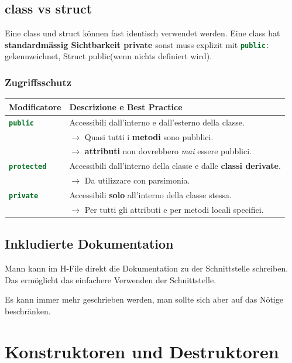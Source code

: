 \subsection{class vs struct}

Eine class und struct können fast identisch verwendet werden. 
Eine class hat \textbf{standardmässig Sichtbarkeit private} sonst muss explizit mit \lstinline[language=C++]|public:| gekennzeichnet, Struct public(wenn nichts definiert wird).

\subsubsection{Zugriffsschutz}
\begin{tabular}{|l|l|}
    \hline
    \textbf{Modificatore} & \textbf{Descrizione e Best Practice} \\ \hline
    \lstinline[language=C++]|public| & Accessibili dall'interno e dall'esterno della classe. \\ 
    & $\rightarrow$ Quasi tutti i \textbf{metodi} sono pubblici. \\ 
    & $\rightarrow$ \textbf{attributi} non dovrebbero \textit{mai} essere pubblici. \\ \hline
    \lstinline[language=C++]|protected| & Accessibili dall'interno della classe e dalle \textbf{classi derivate}. \\ 
    & $\rightarrow$ Da utilizzare con parsimonia. \\ \hline
    \lstinline[language=C++]|private| & Accessibili \textbf{solo} all'interno della classe stessa. \\ 
    & $\rightarrow$ Per tutti gli attributi e per metodi locali specifici. \\ \hline
\end{tabular}

\subsection{Inkludierte Dokumentation}

Mann kann im H-File direkt die Dokumentation zu der Schnittstelle schreiben. 
Das ermöglicht das einfachere Verwenden der Schnittstelle.



Es kann immer mehr geschrieben werden, man sollte sich aber auf das Nötige beschränken.

\section{Konstruktoren und Destruktoren}

